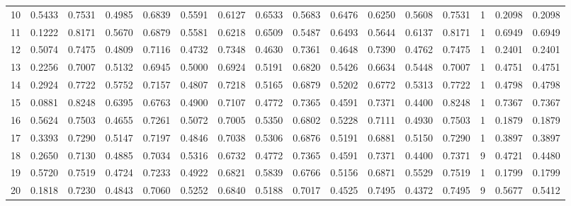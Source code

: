 \begin{tabular}{lrrrrrrrrrrrrrrr}
10  &      0.5433 &  0.7531 &  0.4985 &  0.6839 &  0.5591 &  0.6127 &  0.6533 &  0.5683 &  0.6476 &  0.6250 &   0.5608 &     0.7531 &      1 &                    0.2098 &                     0.2098 \\
11  &      0.1222 &  0.8171 &  0.5670 &  0.6879 &  0.5581 &  0.6218 &  0.6509 &  0.5487 &  0.6493 &  0.5644 &   0.6137 &     0.8171 &      1 &                    0.6949 &                     0.6949 \\
12  &      0.5074 &  0.7475 &  0.4809 &  0.7116 &  0.4732 &  0.7348 &  0.4630 &  0.7361 &  0.4648 &  0.7390 &   0.4762 &     0.7475 &      1 &                    0.2401 &                     0.2401 \\
13  &      0.2256 &  0.7007 &  0.5132 &  0.6945 &  0.5000 &  0.6924 &  0.5191 &  0.6820 &  0.5426 &  0.6634 &   0.5448 &     0.7007 &      1 &                    0.4751 &                     0.4751 \\
14  &      0.2924 &  0.7722 &  0.5752 &  0.7157 &  0.4807 &  0.7218 &  0.5165 &  0.6879 &  0.5202 &  0.6772 &   0.5313 &     0.7722 &      1 &                    0.4798 &                     0.4798 \\
15  &      0.0881 &  0.8248 &  0.6395 &  0.6763 &  0.4900 &  0.7107 &  0.4772 &  0.7365 &  0.4591 &  0.7371 &   0.4400 &     0.8248 &      1 &                    0.7367 &                     0.7367 \\
16  &      0.5624 &  0.7503 &  0.4655 &  0.7261 &  0.5072 &  0.7005 &  0.5350 &  0.6802 &  0.5228 &  0.7111 &   0.4930 &     0.7503 &      1 &                    0.1879 &                     0.1879 \\
17  &      0.3393 &  0.7290 &  0.5147 &  0.7197 &  0.4846 &  0.7038 &  0.5306 &  0.6876 &  0.5191 &  0.6881 &   0.5150 &     0.7290 &      1 &                    0.3897 &                     0.3897 \\
18  &      0.2650 &  0.7130 &  0.4885 &  0.7034 &  0.5316 &  0.6732 &  0.4772 &  0.7365 &  0.4591 &  0.7371 &   0.4400 &     0.7371 &      9 &                    0.4721 &                     0.4480 \\
19  &      0.5720 &  0.7519 &  0.4724 &  0.7233 &  0.4922 &  0.6821 &  0.5839 &  0.6766 &  0.5156 &  0.6871 &   0.5529 &     0.7519 &      1 &                    0.1799 &                     0.1799 \\
20  &      0.1818 &  0.7230 &  0.4843 &  0.7060 &  0.5252 &  0.6840 &  0.5188 &  0.7017 &  0.4525 &  0.7495 &   0.4372 &     0.7495 &      9 &                    0.5677 &                     0.5412 \\

\end{tabular}
